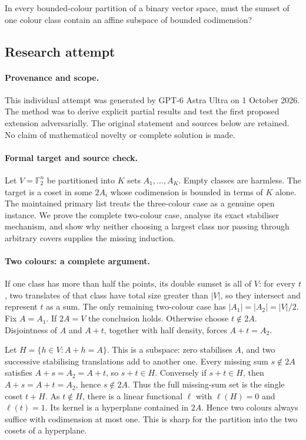 \documentclass[11pt,a4paper]{article}
\newcommand{\F}{\mathbb{F}}
\begin{document}
In every bounded-colour partition of a binary vector space, must the sumset of one colour class contain an affine subspace of bounded codimension?

\subsection{Research attempt}

\paragraph{Provenance and scope.}
This individual attempt was generated by GPT-6 Astra Ultra on 1 October 2026. The method was to derive explicit partial results and test the first proposed extension adversarially. The original statement and sources below are retained. No claim of mathematical novelty or complete solution is made.

\paragraph{Formal target and source check.}
Let $V=\F_2^n$ be partitioned into $K$ sets $A_1,\ldots,A_K$. Empty classes are harmless. The target is a coset in some $2A_i$ whose codimension is bounded in terms of $K$ alone. The maintained primary list treats the three-colour case as a genuine open instance. We prove the complete two-colour case, analyse its exact stabiliser mechanism, and show why neither choosing a largest class nor passing through arbitrary covers supplies the missing induction.

\paragraph{Two colours: a complete argument.}
If one class has more than half the points, its double sumset is all of $V$: for every $t$, two translates of that class have total size greater than $|V|$, so they intersect and represent $t$ as a sum. The only remaining two-colour case has $|A_1|=|A_2|=|V|/2$. Fix $A=A_1$. If $2A=V$ the conclusion holds. Otherwise choose $t\notin2A$. Disjointness of $A$ and $A+t$, together with half density, forces $A+t=A_2$.

Let $H=\{h\in V:A+h=A\}$. This is a subspace: zero stabilises $A$, and two successive stabilising translations add to another one. Every missing sum $s\notin2A$ satisfies $A+s=A_2=A+t$, so $s+t\in H$. Conversely if $s+t\in H$, then $A+s=A+t=A_2$, hence $s\notin2A$. Thus the full missing-sum set is the single coset $t+H$. As $t\notin H$, there is a linear functional $\ell$ with $\ell(H)=0$ and $\ell(t)=1$. Its kernel is a hyperplane contained in $2A$. Hence two colours always suffice with codimension at most one. This is sharp for the partition into the two cosets of a hyperplane.
\end{document}
